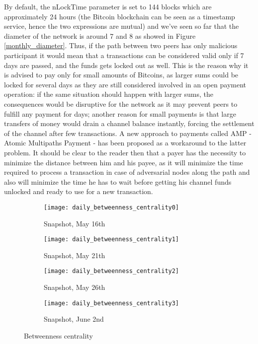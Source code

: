 	By default, the nLockTime parameter is set to 144 blocks which are approximately 24 hours (the Bitcoin blockchain can be seen as a timestamp service, hence the two expressions are mutual) and we've seen so far that the diameter of the network is around 7 and 8 as showed in Figure \ref{monthly_diameter}. Thus, if the path between two peers has only malicious participant it would mean that a transactions can be considered valid only if 7 days are passed, and the funds gets locked out as well. This is the reason why it is advised to pay only for small amounts of Bitcoins, as larger sums could be locked for several days as they are still considered involved in an open payment operation: if the same situation should happen with larger sums, the consequences would be disruptive for the network as it may prevent peers to fulfill any payment for days; another reason for small payments is that large transfers of money would drain a channel balance instantly, forcing the settlement of the channel after few transactions. A new approach to payments called AMP \cite{Amp2018} - Atomic Multipaths Payment - has been proposed as a workaround to the latter problem. It should be clear to the reader then that a payer has the necessity to minimize the distance between him and his payee, as it will minimize the time required to process a transaction in case of adversarial nodes along the path and also will minimize the time he has to wait before getting his channel funds unlocked and ready to use for a new transaction.
	
	\begin{figure}
		\centering
		\begin{subfigure}{0.45\textwidth}
			\centering
			\texttt{[image: daily\_betweenness\_centrality0]}
			\caption{Snapshot, May 16th}
			\label{daily_beetwenness0}
		\end{subfigure}
		\begin{subfigure}{0.45\textwidth}
			\centering
			\texttt{[image: daily\_betweenness\_centrality1]}
			\caption{Snapshot, May 21th}
			\label{daily_betweenness1}
		\end{subfigure}
		\begin{subfigure}{0.45\textwidth}
			\centering
			\texttt{[image: daily\_betweenness\_centrality2]}
			\caption{Snapshot, May 26th}
			\label{daily_betweenness2}
		\end{subfigure}
		\begin{subfigure}{0.45\textwidth}
			\centering
			\texttt{[image: daily\_betweenness\_centrality3]}
			\caption{Snapshot, June 2nd}
			\label{daily_betweenness3}
		\end{subfigure}
		
		\caption{Betweenness centrality}
		\label{daily_betweenness}
	\end{figure}
	
